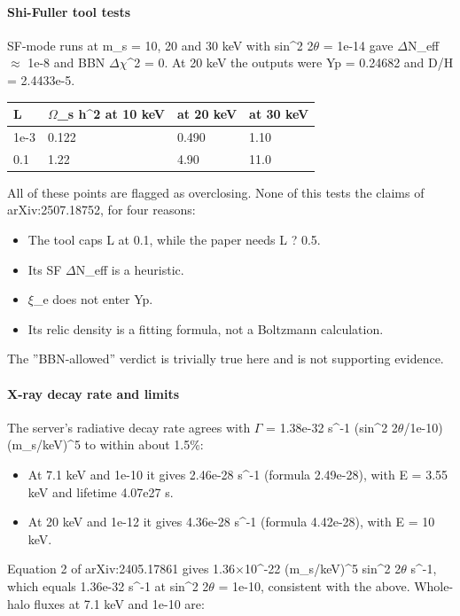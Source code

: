 \documentclass[11pt,a4paper]{article}
\begin{document}
\paragraph{Shi-Fuller tool tests}
SF-mode runs at m\_s = 10, 20 and 30 keV with sin\textasciicircum{}2 2$\theta$ = 1e-14 gave $\Delta$N\_eff $\approx$ 1e-8 and BBN $\Delta$$\chi$\textasciicircum{}2 = 0. At 20 keV the outputs were Yp = 0.24682 and D/H = 2.4433e-5.

\begin{longtable}{@{}p{}p{}p{}p{}@{}}
\toprule
\textbf{L} & \textbf{$\Omega$\_s h\textasciicircum{}2 at 10 keV} & \textbf{at 20 keV} & \textbf{at 30 keV} \\ \midrule \endhead
1e-3 & 0.122 & 0.490 & 1.10 \\
0.1 & 1.22 & 4.90 & 11.0 \\
\bottomrule\end{longtable}
All of these points are flagged as overclosing. None of this tests the claims of arXiv:2507.18752, for four reasons:

\begin{itemize}
  \item The tool caps L at 0.1, while the paper needs L ? 0.5.
  \item Its SF $\Delta$N\_eff is a heuristic.
  \item $\xi$\_e does not enter Yp.
  \item Its relic density is a fitting formula, not a Boltzmann calculation.
\end{itemize}
The ''BBN-allowed'' verdict is trivially true here and is not supporting evidence.

\paragraph{X-ray decay rate and limits}
The server's radiative decay rate agrees with $\Gamma$ = 1.38e-32 s\textasciicircum{}-1 (sin\textasciicircum{}2 2$\theta$/1e-10)(m\_s/keV)\textasciicircum{}5 to within about 1.5\%:

\begin{itemize}
  \item At 7.1 keV and 1e-10 it gives 2.46e-28 s\textasciicircum{}-1 (formula 2.49e-28), with E = 3.55 keV and lifetime 4.07e27 s.
  \item At 20 keV and 1e-12 it gives 4.36e-28 s\textasciicircum{}-1 (formula 4.42e-28), with E = 10 keV.
\end{itemize}
Equation 2 of arXiv:2405.17861 gives 1.36$\times$10\textasciicircum{}-22 (m\_s/keV)\textasciicircum{}5 sin\textasciicircum{}2 2$\theta$ s\textasciicircum{}-1, which equals 1.36e-32 s\textasciicircum{}-1 at sin\textasciicircum{}2 2$\theta$ = 1e-10, consistent with the above. Whole-halo fluxes at 7.1 keV and 1e-10 are:
\end{document}
